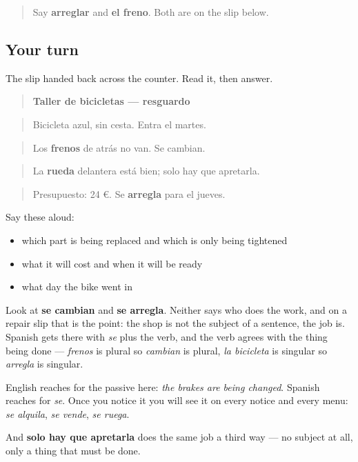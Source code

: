 \begin{quote}
Say \textbf{arreglar} and \textbf{el freno}. Both are on the slip below.
\end{quote}

\subsection*{Your turn}
The slip handed back across the counter. Read it, then answer.

\begin{quote}
\textbf{Taller de bicicletas — resguardo}
\end{quote}

\begin{quote}
Bicicleta azul, sin cesta. Entra el martes.
\end{quote}

\begin{quote}
Los \textbf{frenos} de atrás no van. Se cambian.
\end{quote}

\begin{quote}
La \textbf{rueda} delantera está bien; solo hay que apretarla.
\end{quote}

\begin{quote}
Presupuesto: 24 €. Se \textbf{arregla} para el jueves.
\end{quote}

Say these aloud:

\begin{itemize}
\raggedright
  \item which part is being replaced and which is only being tightened
  \item what it will cost and when it will be ready
  \item what day the bike went in
\end{itemize}

\begin{culture}
Look at \textbf{se cambian} and \textbf{se arregla}. Neither says who does the work, and on a repair slip that is the point: the shop is not the subject of a sentence, the job is. Spanish gets there with \emph{se} plus the verb, and the verb agrees with the thing being done — \emph{frenos} is plural so \emph{cambian} is plural, \emph{la bicicleta} is singular so \emph{arregla} is singular.

English reaches for the passive here: \emph{the brakes are being changed}. Spanish reaches for \emph{se}. Once you notice it you will see it on every notice and every menu: \emph{se alquila}, \emph{se vende}, \emph{se ruega}.

And \textbf{solo hay que apretarla} does the same job a third way — no subject at all, only a thing that must be done.
\end{culture}

